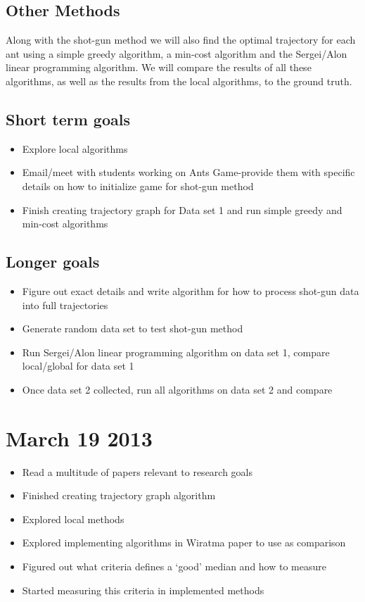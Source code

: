 \documentclass[12pt]{article}
\begin{document}
\subsection{Other Methods}
  Along with the shot-gun method we will also find the optimal trajectory for each ant using a simple greedy algorithm, a min-cost algorithm and the
Sergei/Alon linear programming algorithm. We will compare the results of all these algorithms, as well as the results from the local algorithms, to the 
ground truth. 
\subsection{Short term goals}
\begin{itemize}
 \item Explore local algorithms
 \item Email/meet with students working on Ants Game-provide them with specific details on how to initialize game for shot-gun method
 \item Finish creating trajectory graph for Data set 1 and run simple greedy and min-cost algorithms
\end{itemize}
\subsection{Longer goals}
\begin{itemize}
 \item Figure out exact details and write algorithm for how to process shot-gun data into full trajectories
 \item Generate random data set to test shot-gun method
 \item Run Sergei/Alon linear programming algorithm on data set 1, compare local/global for data set 1
 \item Once data set 2 collected, run all algorithms on data set 2 and compare
\end{itemize}

\section{March 19 2013}
\begin{itemize}
\item Read a multitude of papers relevant to research goals
\item Finished creating trajectory graph algorithm
\item Explored local methods
\item Explored implementing algorithms in Wiratma paper to use as comparison
\item Figured out what criteria defines a `good' median and how to measure 
\item Started measuring this criteria in implemented methods
\end{itemize}
\end{document}

